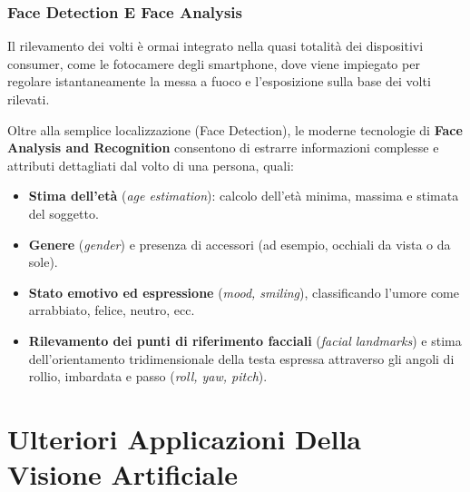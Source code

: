 ﻿\documentclass[11pt, a4paper]{article}
\begin{document}



\subsubsection{Face Detection E Face Analysis}
Il rilevamento dei volti è ormai integrato nella quasi totalità dei dispositivi consumer, come le fotocamere degli smartphone, dove viene impiegato per regolare istantaneamente la messa a fuoco e l'esposizione sulla base dei volti rilevati.


Oltre alla semplice localizzazione (Face Detection), le moderne tecnologie di \textbf{Face Analysis and Recognition} consentono di estrarre informazioni complesse e attributi dettagliati dal volto di una persona, quali:
\begin{itemize}[noitemsep]
    \item \textbf{Stima dell'età} (\emph{age estimation}): calcolo dell'età minima, massima e stimata del soggetto.
    \item \textbf{Genere} (\emph{gender}) e presenza di accessori (ad esempio, occhiali da vista o da sole).
    \item \textbf{Stato emotivo ed espressione} (\emph{mood, smiling}), classificando l'umore come arrabbiato, felice, neutro, ecc.
    \item \textbf{Rilevamento dei punti di riferimento facciali} (\emph{facial landmarks}) e stima dell'orientamento tridimensionale della testa espressa attraverso gli angoli di rollio, imbardata e passo (\emph{roll, yaw, pitch}).
\end{itemize}


\section{Ulteriori Applicazioni Della Visione Artificiale}
\end{document}

